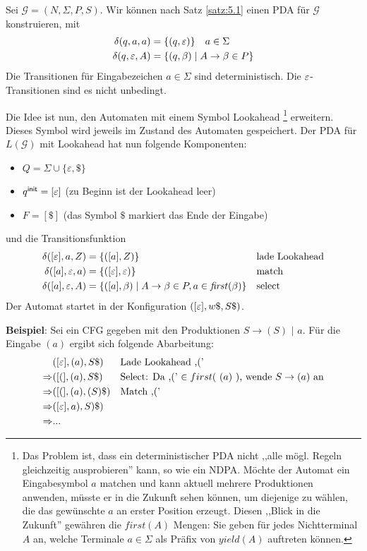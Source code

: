 {Sei $\mathcal{G} = (N, \Sigma, P, S)$.
Wir können nach Satz \ref{satz:5.1} einen \ac{PDA} für $\mathcal{G}$ konstruieren, mit
\begin{align*}
  \delta(q, a, a) &= \{(q, \varepsilon)\} \quad a \in \Sigma \\
  \delta(q, \varepsilon, A) &= \{(q, \beta)  \mid A \to \beta \in P\}
\end{align*}
Die Transitionen für Eingabezeichen $a \in \Sigma$ sind deterministisch.
Die $\varepsilon$-Transitionen sind es nicht unbedingt.

Die Idee ist nun, den Automaten mit einem Symbol Lookahead \footnote{Das Problem ist, dass ein deterministischer \ac{PDA} nicht ,,alle mögl. Regeln gleichzeitig ausprobieren'' kann, so wie ein NDPA. Möchte der Automat ein Eingabesymbol $a$ matchen und kann aktuell mehrere Produktionen anwenden, müsste er in die Zukunft sehen können, um diejenige zu wählen, die das gewünschte $a$ an erster Position erzeugt. Diesen ,,Blick in die Zukunft'' gewähren die $first(A)$ Mengen: Sie geben für jedes Nichtterminal $A$ an, welche Terminale $a \in \Sigma$ als Präfix von $yield(A)$ auftreten können.} 
erweitern. Dieses Symbol wird jeweils im Zustand des Automaten
gespeichert. Der \ac{PDA} für $L (\mathcal{G})$ mit Lookahead hat nun
folgende Komponenten:
\begin{itemize}
\item $Q = \Sigma\cup \{\varepsilon, \$\}$
\item $q^\mathsf{init} = [\varepsilon]$ (zu Beginn ist der Lookahead leer)
\item $F = [\$]$  (das Symbol $\$$ markiert das Ende der Eingabe)
\end{itemize}
und die Transitionsfunktion
\begin{align*}
  \delta ([\varepsilon], a, Z) & = \{([a], Z) \} & & \text{lade Lookahead} \\
  \delta ([a], \varepsilon, a) & = \{([\varepsilon], \varepsilon) \} && \text{match}
  \\
  \delta ([a], \varepsilon, A) & = \{([a], \beta) \mid A\to\beta\in P, a \in
  \mathit{first} (\beta) \} && \text{select}
\end{align*}
Der Automat startet in der Konfiguration $([\varepsilon], w\$, S\$)$.

\textbf{Beispiel}: Sei ein \ac{CFG} gegeben mit den Produktionen $S \to ( S )$ $ |$ $ a$. Für die Eingabe $(a)$ ergibt sich folgende Abarbeitung:
\begin{align*}
              & ([\varepsilon], (a), S\$ )   && \text{Lade Lookahead ,('}\\
  \Rightarrow & ([(], (a), S\$ )   && \text{Select: Da ,(' $\in first($ $(a)$ $ )$, wende $S \to (a)$ an}\\
  \Rightarrow & ([(], (a), (S)\$ ) && \text{Match ,('}\\
  \Rightarrow & ([\varepsilon], a), S)\$) \\
  \Rightarrow & ...
\end{align*}

}

